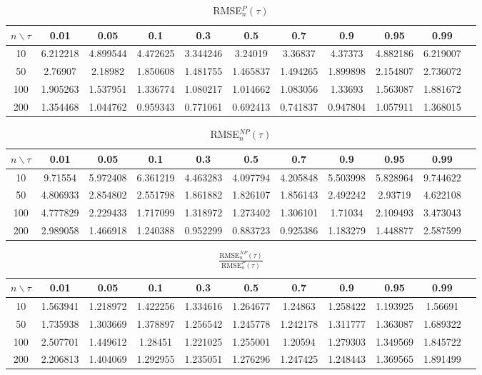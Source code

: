 \begin{table}[H]
\centering
\caption{RMSE$^P_n(\tau)$}
\label{tab:rmse_p}
\renewcommand{\arraystretch}{1.2}
\begin{tabular}{|c|c|c|c|c|c|c|c|c|c|c|}
\hline
$n \backslash \tau$ & 0.01 & 0.05 & 0.1 & 0.3 & 0.5 & 0.7 & 0.9 & 0.95 & 0.99 \\
\hline
10  & 6.212218 & 4.899544 & 4.472625 & 3.344246 & 3.24019 & 3.36837 & 4.37373 & 4.882186 & 6.219007 \\
50  & 2.76907  & 2.18982  & 1.850608 & 1.481755 & 1.465837 & 1.494265 & 1.899898 & 2.154807 & 2.736072 \\
100 & 1.905263 & 1.537951 & 1.336774 & 1.080217 & 1.014662 & 1.083056 & 1.33693  & 1.563087 & 1.881672 \\
200 & 1.354468 & 1.044762 & 0.959343 & 0.771061 & 0.692413 & 0.741837 & 0.947804 & 1.057911 & 1.368015 \\
\hline
\end{tabular}
\end{table}

\begin{table}[H]
\centering
\caption{RMSE$^{NP}_n(\tau)$}
\label{tab:rmse_np}
\renewcommand{\arraystretch}{1.2}
\begin{tabular}{|c|c|c|c|c|c|c|c|c|c|c|}
\hline
$n \backslash \tau$ & 0.01 & 0.05 & 0.1 & 0.3 & 0.5 & 0.7 & 0.9 & 0.95 & 0.99 \\
\hline
10  & 9.71554  & 5.972408 & 6.361219 & 4.463283 & 4.097794 & 4.205848 & 5.503998 & 5.828964 & 9.744622 \\
50  & 4.806933 & 2.854802 & 2.551798 & 1.861882 & 1.826107 & 1.856143 & 2.492242 & 2.93719  & 4.622108 \\
100 & 4.777829 & 2.229433 & 1.717099 & 1.318972 & 1.273402 & 1.306101 & 1.71034  & 2.109493 & 3.473043 \\
200 & 2.989058 & 1.466918 & 1.240388 & 0.952299 & 0.883723 & 0.925386 & 1.183279 & 1.448877 & 2.587599 \\
\hline
\end{tabular}
\end{table}


\begin{table}[H]
\centering
\caption{ $\frac{\text{RMSE}^{NP}_n(\tau)}{\text{RMSE}^{P}_n(\tau)}$ }
\label{tab:rmse_ratio}
\renewcommand{\arraystretch}{1.2}
\begin{tabular}{|c|c|c|c|c|c|c|c|c|c|c|}
\hline
$n \backslash \tau$ & 0.01 & 0.05 & 0.1 & 0.3 & 0.5 & 0.7 & 0.9 & 0.95 & 0.99 \\
\hline
10  & 1.563941 & 1.218972 & 1.422256 & 1.334616 & 1.264677 & 1.24863  & 1.258422 & 1.193925 & 1.56691  \\
50  & 1.735938 & 1.303669 & 1.378897 & 1.256542 & 1.245778 & 1.242178 & 1.311777 & 1.363087 & 1.689322 \\
100 & 2.507701 & 1.449612 & 1.28451  & 1.221025 & 1.255001 & 1.20594  & 1.279303 & 1.349569 & 1.845722 \\
200 & 2.206813 & 1.404069 & 1.292955 & 1.235051 & 1.276296 & 1.247425 & 1.248443 & 1.369565 & 1.891499 \\
\hline
\end{tabular}
\end{table}


